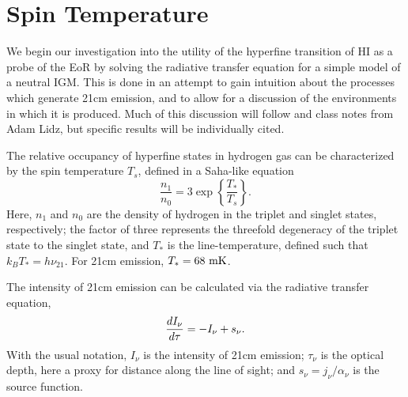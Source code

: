 \section{Spin Temperature}\label{sec:SpinTemp}

We begin our investigation into the utility of the hyperfine transition of HI as a probe of the EoR
by solving the radiative transfer equation for a simple model of a neutral IGM. This is done in an
attempt to gain intuition about the processes which generate 21cm emission, and to allow for a
discussion of the environments in which it is produced. Much of this discussion will follow
\citet{FOB} and class notes from Adam Lidz, but specific results will be individually cited.

The relative occupancy of hyperfine states in hydrogen gas can be characterized by the spin
temperature $T_{s}$, defined in a Saha-like equation 
\begin{equation}
  \frac{n_1}{n_0} = 3\exp\left\{\frac{T_*}{T_s}\right\}.
\end{equation}
Here, $n_1$ and $n_0$ are the density of hydrogen in the triplet and singlet states, respectively;
the factor of three represents the threefold degeneracy of the triplet state to the singlet state,
and $T_*$ is the line-temperature, defined such that $k_BT_* = h\nu_{21}$. For 21cm emission, $T_* =
68\ {\rm mK}$.

The intensity of 21cm emission can be calculated via the radiative transfer equation,
\begin{equation}
  \frac{d I_\nu}{d \tau} = - I_\nu + s_\nu.
  \label{eq:RTE}
\end{equation}
With the usual notation, $I_\nu$ is the intensity of 21cm emission; $\tau_\nu$ is the optical depth,
here a proxy for distance along the line of sight; and $s_\nu = j_\nu/\alpha_\nu $ is the source function.

